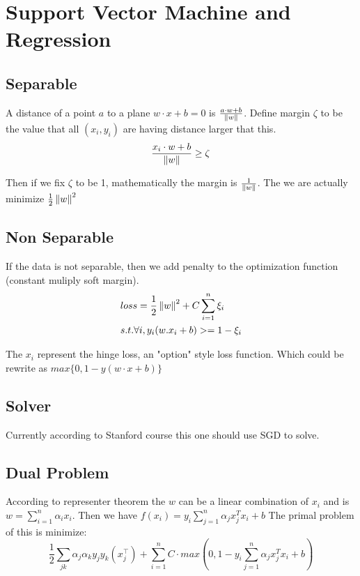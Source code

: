 \section{Support Vector Machine and Regression}

\subsection{Separable}
A distance of a point $a$ to a plane $w \cdot x + b = 0$ is $\frac{a\cdot w + b}{\left\lVert w\right\rVert}$.
Define margin $\zeta$ to be the value that all $(x_i, y_i)$ are having distance larger that this.
\begin{equation}
\frac{x_i\cdot w + b}{\left\lVert w\right\rVert} \geq \zeta
\end{equation}

Then if we fix $\zeta$ to be 1, mathematically the margin is $\frac{1}{\left\lVert w\right\rVert}$. The we are actually minimize $\frac{1}{2} \left\lVert w\right\rVert^2$

\subsection{Non Separable}
If the data is not separable, then we add penalty to the optimization function (constant muliply soft margin).
\begin{equation}
  \begin{aligned}
    &loss = \frac{1}{2} \left\lVert w\right\rVert^2 + C\sum_{i=1} ^ n\xi_i \\
    &s.t. \forall i, y_i(w.x_i + b) >= 1 - \xi_i
  \end{aligned}
\end{equation}

The $x_i$ represent the {\color{blue}hinge loss}, an "option" style loss function. Which could be rewrite as $max\{0, 1 - y(w\cdot x + b)\}$

\subsection{Solver}
Currently according to Stanford course this one should use SGD to solve.

\subsection{Dual Problem}
According to representer theorem the $w$ can be a linear combination of $x_i$ and is $w = \sum_{i=1}^n \alpha_i x_i$. Then we have $f(x_i) = y_i\sum_{j=1}^n \alpha_j  x_j^T x_i + b$
The primal problem of this is minimize:
\begin{equation}
  \frac{1}{2} \sum_{jk} \alpha_j \alpha_k y_j y_k(x_j^\top) + \sum_{i=1}^n C \cdot max(0, 1-y_i\sum_{j=1}^n \alpha_j  x_j^T x_i + b)
\end{equation}

